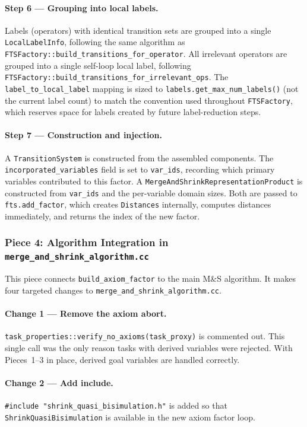 \documentclass[11pt,a4paper]{article}
\begin{document}
\paragraph{Step 6 — Grouping into local labels.}
Labels (operators) with identical transition sets are grouped into a single
\texttt{LocalLabelInfo}, following the same algorithm as
\texttt{FTSFactory::build\_transitions\_for\_operator}.  All irrelevant operators
are grouped into a single self-loop local label, following
\texttt{FTSFactory::build\_transitions\_for\_irrelevant\_ops}.  The
\texttt{label\_to\_local\_label} mapping is sized to
\texttt{labels.get\_max\_num\_labels()} (not the current label count) to match
the convention used throughout \texttt{FTSFactory}, which reserves space for
labels created by future label-reduction steps.

\paragraph{Step 7 — Construction and injection.}
A \texttt{TransitionSystem} is constructed from the assembled components.  The
\texttt{incorporated\_variables} field is set to \texttt{var\_ids}, recording
which primary variables contributed to this factor.  A
\texttt{MergeAndShrinkRepresentationProduct} is constructed from \texttt{var\_ids}
and the per-variable domain sizes.  Both are passed to \texttt{fts.add\_factor},
which creates \texttt{Distances} internally, computes distances immediately, and
returns the index of the new factor.

\subsubsection{Piece 4: Algorithm Integration in \texttt{merge\_and\_shrink\_algorithm.cc}}
\label{sec:piece4}

This piece connects \texttt{build\_axiom\_factor} to the main M\&S algorithm.
It makes four targeted changes to \texttt{merge\_and\_shrink\_algorithm.cc}.

\paragraph{Change 1 — Remove the axiom abort.}
\texttt{task\_properties::verify\_no\_axioms(task\_proxy)} is commented out.
This single call was the only reason tasks with derived variables were rejected.
With Pieces~1--3 in place, derived goal variables are handled correctly.

\paragraph{Change 2 — Add include.}
\texttt{\#include "shrink\_quasi\_bisimulation.h"} is added so that
\texttt{ShrinkQuasiBisimulation} is available in the new axiom factor loop.
\end{document}

